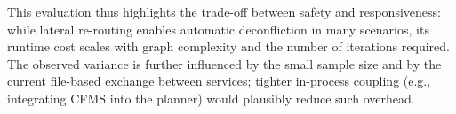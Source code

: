 \medskip
\noindent
This evaluation thus highlights the trade-off between safety and responsiveness: 
while lateral re-routing enables automatic deconfliction in many scenarios, 
its runtime cost scales with graph complexity and the number of iterations required.
The observed variance is further influenced by the small sample size and by the current file-based exchange between services; tighter in-process coupling (e.g., integrating CFMS into the planner) would plausibly reduce such overhead.

